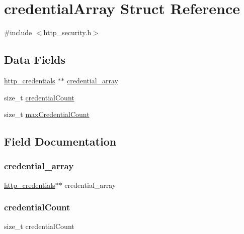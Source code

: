 \hypertarget{structcredential_array}{}\section{credential\+Array Struct Reference}
\label{structcredential_array}


{\ttfamily \#include $<$http\+\_\+security.\+h$>$}

\subsection*{Data Fields}
\begin{DoxyCompactItemize}
\item 
\mbox{\hyperlink{structhttp__credentials}{http\+\_\+credentials}} $\ast$$\ast$ \mbox{\hyperlink{structcredential_array_a175761931591f32637633851b72df02b}{credential\+\_\+array}}
\item 
size\+\_\+t \mbox{\hyperlink{structcredential_array_a4c214b875ab57afdecc3cd95d584e9c8}{credential\+Count}}
\item 
size\+\_\+t \mbox{\hyperlink{structcredential_array_a763fa132eca6baad8db40a2946ad5f3e}{max\+Credential\+Count}}
\end{DoxyCompactItemize}


\subsection{Field Documentation}
\mbox{\label{structcredential_array_a175761931591f32637633851b72df02b}} 
\subsubsection{\texorpdfstring{credential\+\_\+array}{credential\_array}}
{\footnotesize\ttfamily \mbox{\hyperlink{structhttp__credentials}{http\+\_\+credentials}}$\ast$$\ast$ credential\+\_\+array}

\mbox{\label{structcredential_array_a4c214b875ab57afdecc3cd95d584e9c8}} 
\subsubsection{\texorpdfstring{credential\+Count}{credentialCount}}
{\footnotesize\ttfamily size\+\_\+t credential\+Count}

